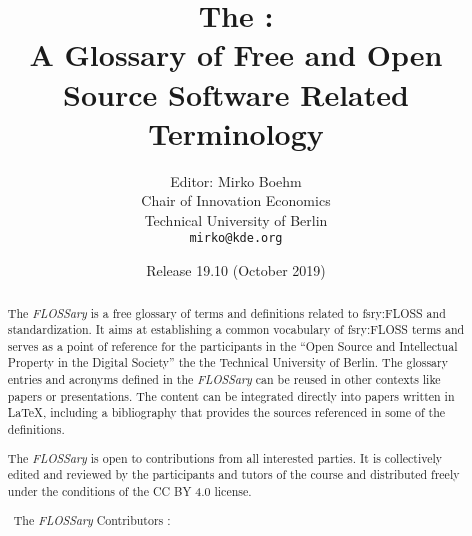 \documentclass[a4paper]{article}
\title{The \flossary:\\
  A Glossary of Free and Open Source Software Related Terminology}
\author{Editor: Mirko Boehm\\
  Chair of Innovation Economics\\
  Technical University of Berlin\\
  \texttt{mirko@kde.org}}
\date{Release 19.10 (October 2019)}
\newcommand{\flossary}{{\em FLOSSary}\xspace}
\begin{document}
\maketitle \thispagestyle{empty}
\begin{abstract}
  \noindent
  The \flossary is a free glossary of terms and definitions related to
  \gls{fsry:FLOSS} and standardization. It aims at establishing a
  common vocabulary of \gls{fsry:FLOSS} terms and serves as a point of
  reference for the participants in the ``Open Source and Intellectual
  Property in the Digital Society'' the the Technical University of
  Berlin. The glossary entries and acronyms defined in the \flossary
  can be reused in other contexts like papers or presentations. The
  content can be integrated directly into papers written in \LaTeX,
  including a bibliography that provides the sources referenced in
  some of the definitions.

  The \flossary is open to contributions from all interested
  parties. It is collectively edited and reviewed by the participants
  and tutors of the course and distributed freely under the conditions
  of the CC BY 4.0 license.

  \vspace{0.5cm}
  \noindent \textcopyright~The \flossary Contributors \ccby:
  \\ 
\end{abstract}

\clearpage
\glsaddall
{}
\printnoidxglossary[nonumberlist]
\clearpage
\printnoidxglossary[type=\acronymtype,nonumberlist]
\clearpage
\printbibliography
\end{document}
